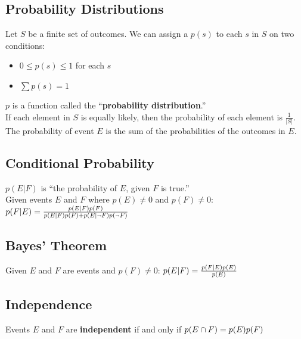\documentclass[letter]{article}
\begin{document}
\begin{multicols}{2}
  \subsection{Probability Distributions} 
  Let $S$ be a finite set of outcomes. We can assign a $p(s)$ to each $s$ in $S$
  on two conditions:
  \begin{itemize} 
    \item $0 \leq p(s) \leq 1$ for each $s$
    \item $\sum{p(s)} = 1$
  \end{itemize}
  $p$ is a function called the ``\textbf{probability distribution}.'' \\
  If each element in $S$ is equally likely, then the probability of each element
  is $\frac{1}{|S|}$. \\
  The probability of event $E$ is the sum of the probabilities of the outcomes in
  $E$.

  \subsection{Conditional Probability} 
  $p(E|F)$ is ``the probability of $E$, given $F$ is true.'' \\
  Given events $E$ and $F$ where $p(E) \neq 0$ and $p(F) \neq 0$:
  $\\p(F|E) = \frac{p(E|F)p(F)}{p(E|F)p(F) + p(E|\neg F)p(\neg F)}$

  \subsection{Bayes' Theorem} 
  Given $E$ and $F$ are events and $p(F) \neq 0$:
  $\\p(E|F) = \frac{p(F|E)p(E)}{p(E)}$

  \subsection{Independence} 
  Events $E$ and $F$ are \textbf{independent} if and only if
  $\\p(E \cap F) = p(E)p(F)$


\end{multicols}
\end{document}
